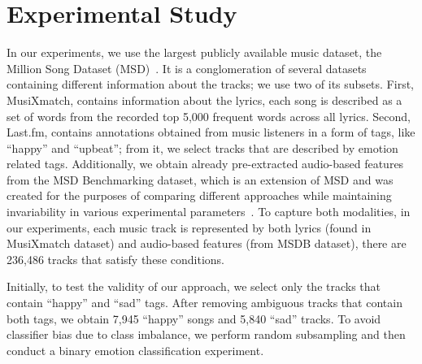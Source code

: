 \documentclass{llncs}
\begin{document}
\section{Experimental Study}
In our experiments, we use 
the largest publicly available music dataset, the Million Song Dataset (MSD)~\cite{DBLP:conf/ismir/Bertin-MahieuxEWL11}. %
It is a conglomeration of several datasets containing different information about the tracks; we use two of its subsets. First, MusiXmatch, contains information about the lyrics,	  %
each song is described as a set of words from the recorded top 5,000 frequent words across all lyrics. Second, Last.fm, contains annotations obtained from music listeners in a form of tags, like ``happy'' and ``upbeat''; from it, we select tracks that are described by emotion related tags. Additionally, we obtain already pre-extracted audio-based features from the MSD Benchmarking dataset, which is an extension of MSD and was created for the purposes of comparing different approaches while maintaining invariability in various experimental parameters~\cite{schindler1}. To capture both modalities, in our experiments, each music track is represented by both lyrics (found in MusiXmatch dataset) and audio-based features (from MSDB dataset), there are 236,486 tracks that satisfy these conditions. 


Initially, to test the validity of our approach, we select only the tracks that contain ``happy'' and ``sad'' tags. After removing ambiguous tracks that contain both tags, we obtain 7,945 ``happy'' songs and 5,840 ``sad'' tracks. To avoid classifier bias due to class imbalance, we perform random subsampling and then conduct a binary emotion classification experiment. %
\end{document}
